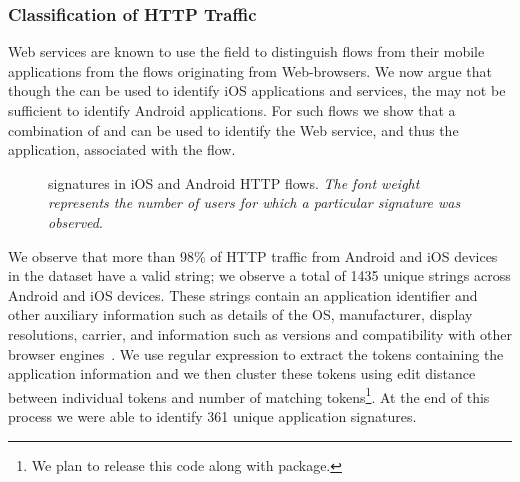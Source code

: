 \subsubsection{Classification of HTTP Traffic}

Web services are known to use the \useragent field to distinguish
flows from their mobile applications from the flows originating from
Web-browsers.  We now argue that though the \useragent can be used to
identify iOS applications and services, the \useragent may not be
sufficient to identify Android applications.  For such flows we show
that a combination of \useragent and \httphost can be used to identify
the Web service, and thus the application, associated with the flow.


\begin{figure}
\newline
{}
\caption{\useragent signatures in  iOS and Android HTTP flows. \emph{The font weight represents the number of users for which a particular signature was observed}.}
\label{fig:http-wordcloud}
\end{figure}

We observe that more than 98\% of HTTP traffic from Android and iOS
devices in the \mobWild dataset have a valid \useragent string; we
observe a total of 1435 unique \useragent strings across Android and
iOS devices.  These \useragent strings contain an application
identifier and other auxiliary information such as details of the OS,
manufacturer, display resolutions, carrier, and information such as
versions and compatibility with other browser
engines~\cite{mozilla:useragentdetection}.  We use regular expression
to extract the tokens containing the application information and we
then cluster these tokens using edit distance between individual
tokens and number of matching tokens\footnote{We plan to release this
  code along with \platname package.}.  At the end of this process we
were able to identify 361 unique application signatures.

